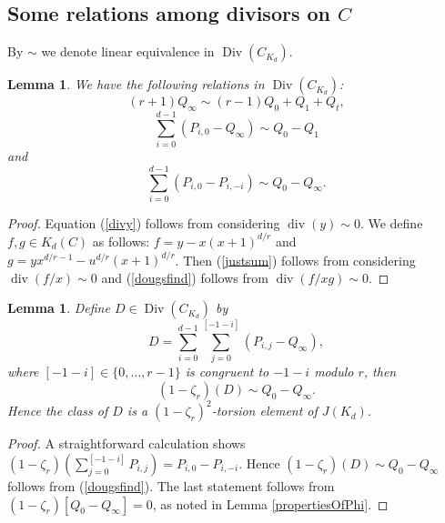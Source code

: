 \documentclass[reqno]{amsart}
\newtheorem{lemma}[thm]{Lemma}
\theoremstyle{definition}
\theoremstyle{remark}
\newcommand{\Div}{\operatorname{Div}}
\newcommand{\divi}{\operatorname{div}}
\def\p{\mathbb{P}}
\begin{document}

\subsection{Some relations among divisors on $C$}

By $\sim$ we denote linear equivalence in $\Div(C_{K_d})$.

\begin{lemma}
\label{tworels}
We have the following relations in $\Div(C_{K_d})$:
\begin{equation}
\label{divy}
(r+1)Q_\infty \sim (r-1)Q_0 + Q_1 + Q_t,
\end{equation}
\begin{equation}
\label{justsum}
\sum_{i=0}^{d-1} (P_{i,0} - Q_{\infty}) \sim Q_0 - Q_1
\end{equation}
and
\begin{equation}
\label{dougsfind}
\sum_{i=0}^{d-1} (P_{i,0} - P_{i,-i}) \sim Q_0 - Q_\infty.
\end{equation}
\end{lemma}
\begin{proof}Equation (\ref{divy}) follows from considering $\divi(y) \sim 0$. We define $f,g \in K_d(C)$ as follows: $f = y - x(x+1)^{d/r}$ and $g = yx^{d/r-1} - u^{d/r} (x+1)^{d/r}$. Then (\ref{justsum}) follows from considering $\divi(f/x) \sim 0$ and (\ref{dougsfind}) follows from $\divi(f/xg)\sim 0$.
\end{proof}

\begin{lemma}
\label{newtorsion}
Define $D \in \Div(C_{K_d})$ by
$$
D = \sum_{i=0}^{d-1} \sum_{j=0}^{[-1-i]} (P_{i,j} - Q_\infty),
$$
where $[-1-i] \in \{0,\ldots,r-1\}$ is congruent to $-1-i$ modulo $r$, then
$$
(1-\zeta_r)(D) \sim Q_0 - Q_\infty.
$$
Hence the class of $D$ is a $(1-\zeta_r)^2$-torsion element of $J(K_d)$.
\end{lemma}
\begin{proof}
A straightforward calculation shows $(1-\zeta_r)(\sum_{j=0}^{[-1-i]} P_{i,j}) = P_{i,0} - P_{i,-i}$. Hence $(1-\zeta_r)(D) \sim Q_0 - Q_\infty$ follows from (\ref{dougsfind}). The last statement follows from $(1-\zeta_r)[Q_0 - Q_\infty] = 0$, as noted in Lemma \ref{propertiesOfPhi}.
\end{proof}
\end{document}
